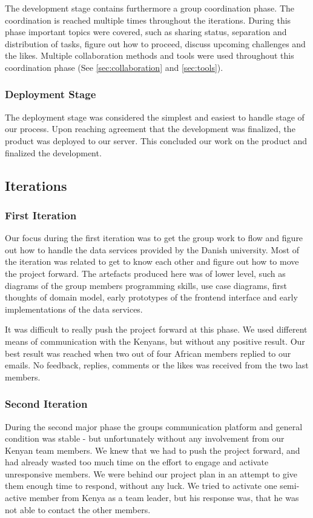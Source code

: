 The development stage contains furthermore a group coordination phase. The coordination is reached multiple times throughout the iterations. During this phase important topics were covered, such as sharing status, separation and distribution of tasks, figure out how to proceed, discuss upcoming challenges and the likes. Multiple collaboration methods and tools were used throughout this coordination phase (See \ref{sec:collaboration} and \ref{sec:tools}).

\subsubsection{Deployment Stage}
The deployment stage was considered the simplest and easiest to handle stage of our process. Upon reaching agreement that the development was finalized, the product was deployed to our server. This concluded our work on the product and finalized the development.

\subsection{Iterations} \label{subsec:iterations}

\subsubsection{First Iteration}
Our focus during the first iteration was to get the group work to flow and figure out how to handle the data services provided by the Danish university. Most of the iteration was related to get to know each other and figure out how to move the project forward. The artefacts produced here was of lower level, such as diagrams of the group members programming skills, use case diagrams, first thoughts of domain model, early prototypes of the frontend interface and early implementations of the data services.

It was difficult to really push the project forward at this phase. We used different means of communication with the Kenyans, but without any positive result. Our best result was reached when two out of four African members replied to our emails. No feedback, replies, comments or the likes was received from the two last members.

\subsubsection{Second Iteration}
During the second major phase the groups communication platform and general condition was stable - but unfortunately without any involvement from our Kenyan team members. We knew that we had to push the project forward, and had already wasted too much time on the effort to engage and activate unresponsive members. We were behind our project plan in an attempt to give them enough time to respond, without any luck. We tried to activate one semi-active member from Kenya as a team leader, but his response was, that he was not able to contact the other members.

